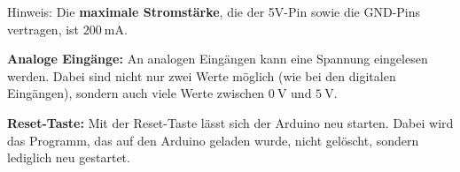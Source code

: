 Hinweis: Die \textbf{maximale Stromstärke}, die der 5V-Pin sowie die GND-Pins vertragen, ist \textbf{$\SI{200}{\milli\ampere}$}.

\textbf{Analoge Eingänge:} An analogen Eingängen kann eine Spannung eingelesen werden. Dabei sind nicht nur zwei Werte möglich (wie bei den digitalen Eingängen), sondern auch viele Werte zwischen $\SI{0}{\volt}$ und $\SI{5}{\volt}$.

\textbf{Reset-Taste:} Mit der Reset-Taste lässt sich der Arduino neu starten. Dabei wird das Programm, das auf den Arduino geladen wurde, nicht gelöscht, sondern lediglich neu gestartet.

%
